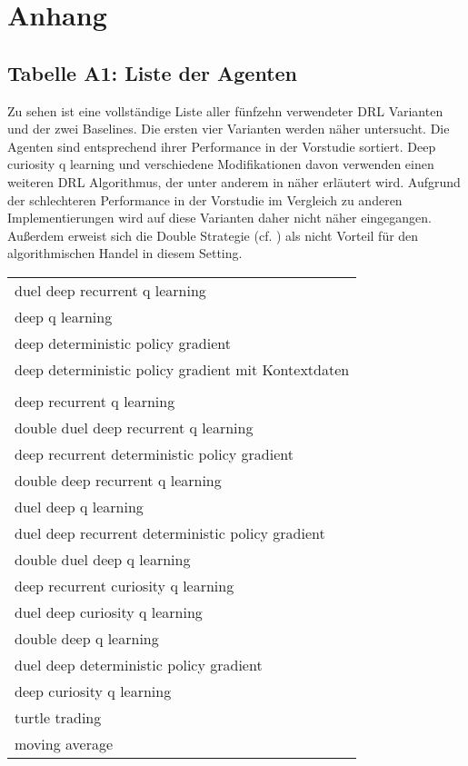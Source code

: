 \chapter*{Anhang}
\label{ch:anhang}
\vspace{-5mm}
\section*{Tabelle A1: Liste der Agenten}
\label{tabe1}

Zu sehen ist eine vollständige Liste aller fünfzehn verwendeter \acs{DRL} Varianten und der zwei Baselines. Die ersten vier Varianten werden näher untersucht.
Die Agenten sind entsprechend ihrer Performance in der Vorstudie sortiert. Deep curiosity q learning und verschiedene Modifikationen davon verwenden einen weiteren \acs{DRL} Algorithmus, der unter anderem in \parencite{10.5555/1671238} näher erläutert wird. Aufgrund der schlechteren Performance in der Vorstudie im Vergleich zu anderen Implementierungen wird auf diese Varianten daher nicht näher eingegangen. Außerdem erweist sich die Double Strategie (cf. \parencite{vanhas}) als nicht Vorteil für den algorithmischen Handel in diesem Setting.
\vspace{1mm}
\begin{table}[h!]
\label{fig:table1h}
\begin{adjustwidth}{-.8in}{0in}
  \begin{center}
  \hline
  \vspace{5}
	\begin{tabular}{l}
	duel deep recurrent q learning\\
	deep q learning\\
	deep deterministic policy gradient\\
	deep deterministic policy gradient mit Kontextdaten\\
	\vspace{-2mm}\\
	deep recurrent q learning\\
	double duel deep recurrent q learning\\
	deep recurrent deterministic policy gradient\\
	double deep recurrent q learning\\
	duel deep q learning\\
	duel deep recurrent deterministic policy gradient\\
	double duel deep q learning\\
	deep recurrent curiosity q learning\\
	duel deep curiosity q learning\\
	double deep q learning\\
	duel deep deterministic policy gradient\\
	deep curiosity q learning\\
	turtle trading\\
	moving average
	  \vspace{8}
    \end{tabular}
    \hline
    \vspace{10}
  \end{center}
  \end{adjustwidth}
\end{table}
